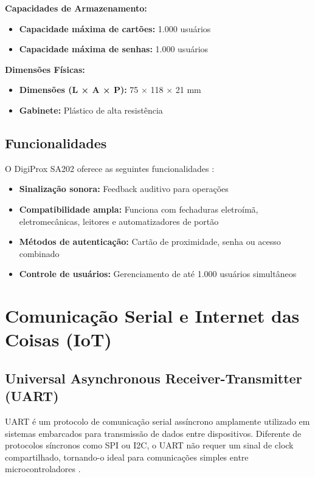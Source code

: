 \textbf{Capacidades de Armazenamento:}
\begin{itemize}
\item \textbf{Capacidade máxima de cartões:} 1.000 usuários
\item \textbf{Capacidade máxima de senhas:} 1.000 usuários
\end{itemize}

\textbf{Dimensões Físicas:}
\begin{itemize}
\item \textbf{Dimensões (L × A × P):} 75 × 118 × 21 mm
\item \textbf{Gabinete:} Plástico de alta resistência
\end{itemize}

\subsection{Funcionalidades}

O DigiProx SA202 oferece as seguintes funcionalidades \cite{intelbras-digiprox-sa202}:

\begin{itemize}
\item \textbf{Sinalização sonora:} Feedback auditivo para operações
\item \textbf{Compatibilidade ampla:} Funciona com fechaduras eletroímã, eletromecânicas, leitores e automatizadores de portão
\item \textbf{Métodos de autenticação:} Cartão de proximidade, senha ou acesso combinado
\item \textbf{Controle de usuários:} Gerenciamento de até 1.000 usuários simultâneos
\end{itemize}

\section{Comunicação Serial e Internet das Coisas (IoT)}
\label{sec:comunicacao-iot}

\subsection{Universal Asynchronous Receiver-Transmitter (UART)}

UART é um protocolo de comunicação serial assíncrono amplamente utilizado em sistemas embarcados para transmissão de dados entre dispositivos. Diferente de protocolos síncronos como SPI ou I2C, o UART não requer um sinal de clock compartilhado, tornando-o ideal para comunicações simples entre microcontroladores \cite{makerhero-esp8266}.

